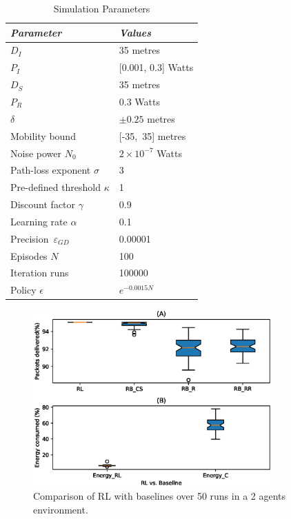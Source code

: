 \documentclass[journal]{IEEEtran}
\begin{document}
\begin{table}
\small
\centering
\caption{Simulation Parameters}
\label{table:simparameters}
\begin{tabular}{ll}
  \hline
 \textit{Parameter} & \textit{Values} \\
  \hline \hline

   $D_{I}$ & 35 metres\\
   $P_{I}$ & [0.001, 0.3] Watts \\
   $D_{S}$ & 35 metres\\
   $P_{R}$ & 0.3 Watts\\
   $\delta$ & $\pm0.25$ metres\\
   Mobility bound & [-35,~35] metres\\
   Noise power $N_0$ & $2 \times 10^{-7}$ Watts\\
   Path-loss exponent $\sigma$ & 3\\
   Pre-defined threshold $\kappa$ & 1\\
   Discount factor $\gamma$ & 0.9\\
   Learning rate $\alpha$ & 0.1\\
   Precision~$\varepsilon_{GD}$ & 0.00001\\
   Episodes $N$ & 100\\
   Iteration runs & 100000\\
   Policy $\epsilon$ & $e^{-0.0015N}$\\

   \hline \hline
 \end{tabular}
 \end{table}



\begin{figure}[!t]
\centering
\includegraphics[width=3.6in]{2agentbaseline.eps}
\caption{Comparison of RL with baselines over 50 runs in a 2 agents environment.}
\label{2agent}
\end{figure}
\end{document}
